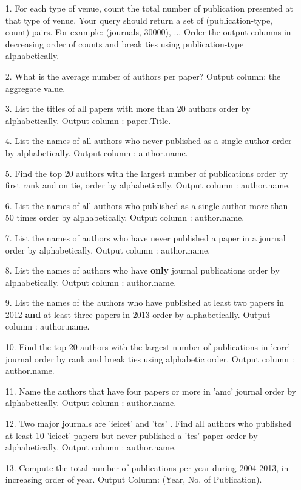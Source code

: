 \documentclass[10pt]{article}
\begin{document}
\begin{enumerate}
\item
[1.] For each type of venue, count the total number of publication presented at that type of venue. Your query should return a set of (publication-type, count) pairs. For example: (journals, 30000), ... Order the output columns in decreasing order of counts and break ties using publication-type alphabetically. 
\item
[2.] What is the average number of authors per paper? Output column: the aggregate value. 
\item
[3.] List the titles of all papers with more than 20 authors order by alphabetically. Output column : paper.Title.
\item
[4.] List the names of all authors who never published as a single author order by alphabetically. Output column : author.name.
\item
[5.] Find the top 20 authors with the largest number of publications order by first rank and on tie, order by alphabetically. Output column : author.name.
\item
[6.] List the names of all authors who published as a single author more than 50 times order by alphabetically. Output column : author.name.
\item
[7.] List the names of authors who have never published a paper in a journal order by alphabetically. Output column : author.name.
\item
[8.] List the names of authors who have \textbf{only} journal publications order by alphabetically. Output column : author.name.
\item
[9.] List the names of the authors who have published at least two papers in 2012 \textbf{and} at least three papers in 2013 order by alphabetically. Output column : author.name.
\item
[10.] Find the top 20 authors with the largest number of publications in 'corr' journal order by rank and break ties using alphabetic order. Output column : author.name.
\item
[11.] Name the authors that have four papers or more in 'amc' journal order by alphabetically. Output column : author.name.
\item
[12.] Two major journals are 'ieicet' and 'tcs' . Find all authors who published at least 10 'ieicet' papers but never published a 'tcs' paper order by alphabetically. Output column : author.name.
\item
[13.] Compute the total number of publications per year during 2004-2013, in increasing order of year. Output Column: (Year, No. of Publication).

\end{enumerate}
\end{document}
